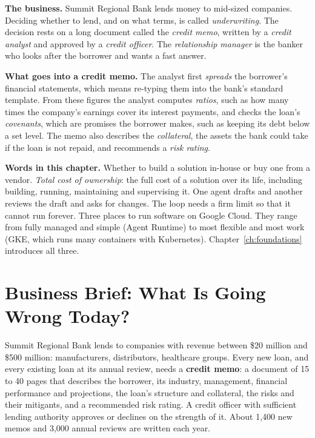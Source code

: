 \begin{beforeyoustart}
\textbf{The business.} Summit Regional Bank lends money to mid-sized companies. Deciding whether to lend, and on what terms, is called \emph{underwriting}. The decision rests on a long document called the \emph{credit memo}, written by a \emph{credit analyst} and approved by a \emph{credit officer}. The \emph{relationship manager} is the banker who looks after the borrower and wants a fast answer.

\textbf{What goes into a credit memo.} The analyst first \emph{spreads} the borrower's financial statements, which means re-typing them into the bank's standard template. From these figures the analyst computes \emph{ratios}, such as how many times the company's earnings cover its interest payments, and checks the loan's \emph{covenants}, which are promises the borrower makes, such as keeping its debt below a set level. The memo also describes the \emph{collateral}, the assets the bank could take if the loan is not repaid, and recommends a \emph{risk rating}.

\textbf{Words in this chapter.}
 Whether to build a solution in-house or buy one from a vendor.
 \emph{Total cost of ownership}: the full cost of a solution over its life, including building, running, maintaining and supervising it.
 One agent drafts and another reviews the draft and asks for changes. The loop needs a firm limit so that it cannot run forever.
 Three places to run software on Google Cloud. They range from fully managed and simple (Agent Runtime) to most flexible and most work (GKE, which runs many containers with Kubernetes). Chapter~\ref{ch:foundations} introduces all three.
\end{beforeyoustart}


\section{Business Brief: What Is Going Wrong Today?}
\label{sec:loan-brief}

Summit Regional Bank lends to companies with revenue between \$20 million and \$500 million: manufacturers, distributors, healthcare groups. Every new loan, and every existing loan at its annual review, needs a \textbf{credit memo}: a document of 15 to 40 pages that describes the borrower, its industry, management, financial performance and projections, the loan's structure and collateral, the risks and their mitigants, and a recommended risk rating. A credit officer with sufficient lending authority approves or declines on the strength of it. About 1{,}400 new memos and 3{,}000 annual reviews are written each year.

